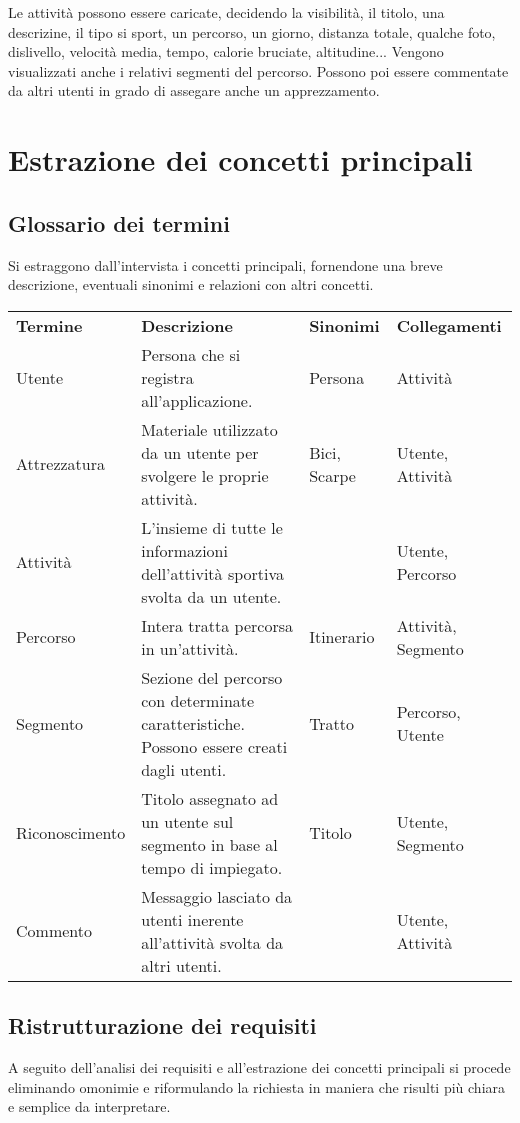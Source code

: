 \documentclass[12pt]{report}
\begin{document}
Le attività possono essere caricate, decidendo la visibilità, il titolo, una descrizine, il tipo si sport, 
un percorso, un giorno, distanza totale, qualche foto, dislivello, velocità media, tempo, calorie bruciate, altitudine... 
Vengono visualizzati anche i relativi segmenti del percorso. Possono poi essere commentate da altri 
utenti in grado di assegare anche un apprezzamento.

\section{Estrazione dei concetti principali}

\subsection*{Glossario dei termini}
Si estraggono dall'intervista i concetti principali, fornendone una breve descrizione, eventuali sinonimi e
relazioni con altri concetti.

\begin{table}[h!]
    \centering
    \renewcommand{\arraystretch}{1.5} %
    \begin{tabularx}{\textwidth}{
        >{\raggedright\arraybackslash}p{}%
        >{\raggedright\arraybackslash}p{}%
        >{\raggedright\arraybackslash}p{}%
        >{\raggedright\arraybackslash}p{}%
        }
    \arrayrulecolor[HTML]{BDBFC3}
    \rowcolor[HTML]{cef3fe} 
    \textbf{Termine} & \textbf{Descrizione} & \textbf{Sinonimi} & \textbf{Collegamenti} \\
    Utente & Persona che si registra all'applicazione. & Persona & Attività\\ \hline
    Attrezzatura & Materiale utilizzato da un utente per svolgere le proprie attività. & Bici, Scarpe & Utente, Attività \\ \hline 
	Attività & L'insieme di tutte le informazioni dell'attività sportiva svolta da un utente. & & Utente, Percorso\\ \hline
    Percorso & Intera tratta percorsa in un'attività. & Itinerario & Attività, Segmento\\ \hline
    Segmento & Sezione del percorso con determinate caratteristiche. Possono essere creati dagli utenti. & Tratto & Percorso, Utente \\ \hline
    Riconoscimento & Titolo assegnato ad un utente sul segmento in base al tempo di impiegato. & Titolo & Utente, Segmento\\ \hline
	Commento & Messaggio lasciato da utenti inerente all'attività svolta da altri utenti. & & Utente, Attività \\
    \end{tabularx}
\end{table}

\subsection*{Ristrutturazione dei requisiti}
A seguito dell'analisi dei requisiti e all'estrazione dei concetti principali si procede eliminando omonimie e
riformulando la richiesta in maniera che risulti più chiara e semplice da interpretare.
\end{document}
